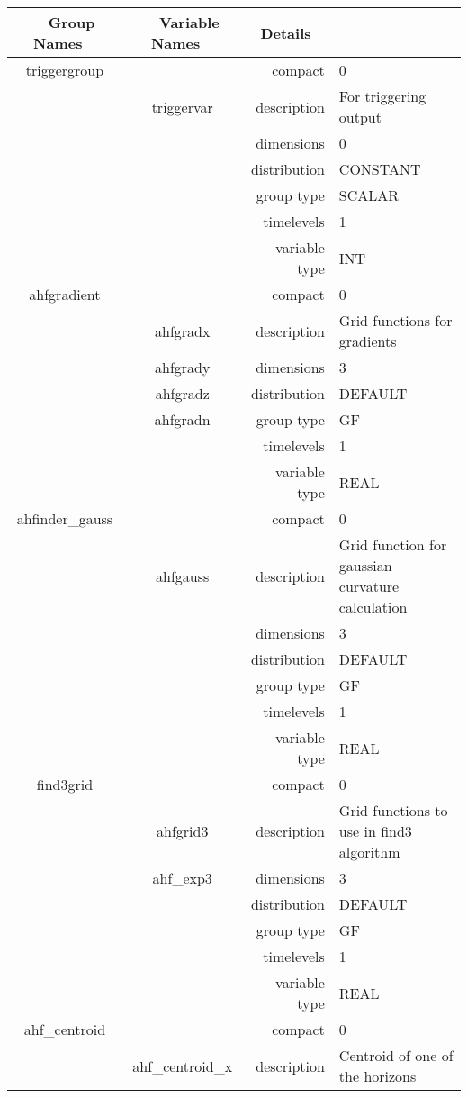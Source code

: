 \vspace{5mm}

\begin{tabular*}{150mm}{|c|c@{\extracolsep{\fill}}|rl|} \hline 
~ {\bf Group Names} ~ & ~ {\bf Variable Names} ~  &{\bf Details} ~ & ~\\ 
\hline 
triggergroup &  & compact & 0 \\ 
 & triggervar & description & For triggering output \\ 
 &  & dimensions & 0 \\ 
 &  & distribution & CONSTANT \\ 
 &  & group type & SCALAR \\ 
 &  & timelevels & 1 \\ 
 &  & variable type & INT \\ 
\hline 
ahfgradient &  & compact & 0 \\ 
 & ahfgradx & description & Grid functions for gradients \\ 
 & ahfgrady & dimensions & 3 \\ 
 & ahfgradz & distribution & DEFAULT \\ 
 & ahfgradn & group type & GF \\ 
 &  & timelevels & 1 \\ 
 &  & variable type & REAL \\ 
\hline 
ahfinder\_gauss &  & compact & 0 \\ 
 & ahfgauss & description & Grid function for gaussian curvature calculation \\ 
 &  & dimensions & 3 \\ 
 &  & distribution & DEFAULT \\ 
 &  & group type & GF \\ 
 &  & timelevels & 1 \\ 
 &  & variable type & REAL \\ 
\hline 
find3grid &  & compact & 0 \\ 
 & ahfgrid3 & description & Grid functions to use in find3 algorithm \\ 
 & ahf\_exp3 & dimensions & 3 \\ 
 &  & distribution & DEFAULT \\ 
 &  & group type & GF \\ 
 &  & timelevels & 1 \\ 
 &  & variable type & REAL \\ 
\hline 
ahf\_centroid &  & compact & 0 \\ 
 & ahf\_centroid\_x & description & Centroid of one of the horizons \\ 

\end{tabular*}
